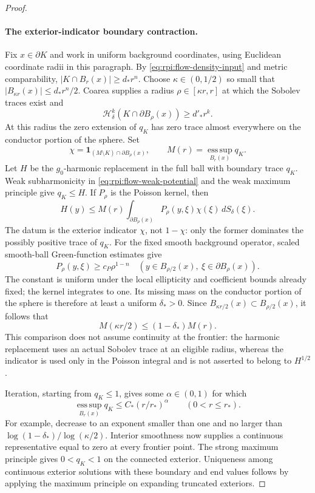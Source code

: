 \begin{proof}
\paragraph{The exterior-indicator boundary contraction.}
Fix $x\in\partial K$ and work in uniform background coordinates,
using Euclidean coordinate radii in this paragraph. By
\eqref{eq:rpi:flow-density-input} and metric comparability,
$|K\cap B_r(x)|\ge d_* r^n$. Choose $\kappa\in(0,1/2)$ so
small that $|B_{\kappa r}(x)|\le d_* r^n/2$. Coarea supplies a
radius $\rho\in[\kappa r,r]$ at which the Sobolev traces exist
and
\[
 \mathcal H^k_\delta(K\cap\partial B_\rho(x))\ge d'_* r^k.
\]
At this radius the zero extension of $q_K$ has zero trace almost
everywhere on the conductor portion of the sphere. Set
\[
 \chi=\mathbf1_{(M\setminus K)\cap\partial B_\rho(x)},
 \qquad M(r)=\operatorname*{ess\,sup}_{B_r(x)}q_K.
\]
Let $H$ be the $g_0$-harmonic replacement in the full ball with
boundary trace $q_K$. Weak subharmonicity in
\eqref{eq:rpi:flow-weak-potential} and the weak maximum principle
give $q_K\le H$. If $P_\rho$ is the Poisson kernel, then
\[
 H(y)\le M(r)\int_{\partial B_\rho(x)}
                 P_\rho(y,\xi)\chi(\xi)\,dS_\delta(\xi).
\]
The datum is the exterior indicator $\chi$, not $1-\chi$:
only the former dominates the possibly positive trace of $q_K$.
For the fixed smooth background operator, scaled smooth-ball
Green-function estimates give
\[
 P_\rho(y,\xi)\ge c_P\rho^{1-n}
 \quad(y\in B_{\rho/2}(x),\ \xi\in\partial B_\rho(x)).
\]
The constant is uniform under the local ellipticity and
coefficient bounds already fixed; the kernel integrates to one.
Its missing mass on the conductor portion of the sphere is
therefore at least a uniform $\delta_*>0$. Since
$B_{\kappa r/2}(x)\subset B_{\rho/2}(x)$, it follows that
\[
 M(\kappa r/2)\le(1-\delta_*)M(r).
\]
This comparison does not assume continuity at the frontier: the
harmonic replacement uses an actual Sobolev trace at an eligible
radius, whereas the indicator is used only in the Poisson
integral and is not asserted to belong to $H^{1/2}$.

Iteration, starting from $q_K\le1$, gives some
$\alpha\in(0,1)$ for which
\[
 \operatorname*{ess\,sup}_{B_r(x)}q_K
 \le C_*(r/r_*)^\alpha\qquad(0<r\le r_*).
\]
For example, decrease to an exponent smaller than one and no
larger than $\log(1-\delta_*)/\log(\kappa/2)$.
Interior smoothness now supplies a continuous representative
equal to zero at every frontier point. The strong maximum
principle gives $0<q_K<1$ on the connected exterior.
Uniqueness among continuous exterior solutions with these
boundary and end values follows by applying the maximum
principle on expanding truncated exteriors.


\end{proof}
